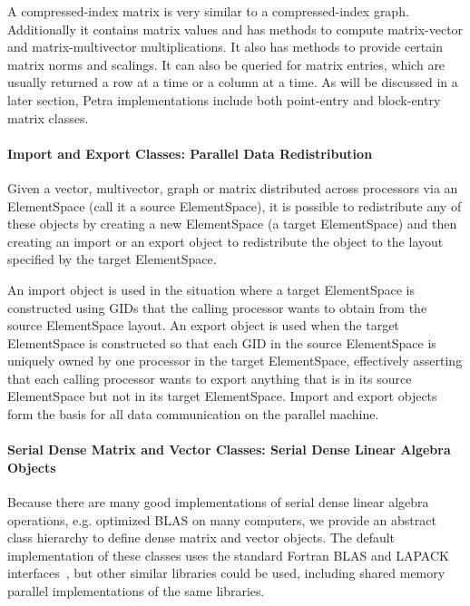 \documentclass[12pt,relax]{PetraObjectModel}
\begin{document}
A compressed-index matrix is very similar to a compressed-index graph. 
Additionally it 
contains matrix values and has methods to compute matrix-vector and
matrix-multivector multiplications.  It also has methods to provide certain
matrix norms and scalings.  It can also be queried for matrix entries, which
are usually returned a row at a time or a column at a time.
As will be discussed in a later section, Petra implementations include both
point-entry and block-entry matrix classes.


\paragraph{Import and Export Classes:  Parallel Data Redistribution}

Given a vector, multivector, graph or matrix distributed across processors
via an ElementSpace (call it a source ElementSpace), it is possible to
redistribute any of these
objects by creating a new ElementSpace (a target ElementSpace) and then
creating an import or
an export object to redistribute the object to the layout specified by the
target ElementSpace.

An import object is used in the situation where a target ElementSpace is
 constructed
using GIDs that the calling processor wants to obtain from the source
 ElementSpace
layout.  An export object is used when the target ElementSpace is constructed
so that each GID in the source ElementSpace is uniquely owned by one processor
 in the target ElementSpace, effectively asserting that each calling processor
 wants to export anything
that is in its source ElementSpace but not in its target ElementSpace.
  Import and export
objects form the basis for all data communication on the parallel machine.

\paragraph{Serial Dense Matrix and Vector Classes:  Serial Dense Linear Algebra Objects}

Because there are many good implementations of serial dense linear algebra
operations, e.g. optimized BLAS on many computers, we provide an abstract
class hierarchy to define dense matrix and vector objects.  The default
implementation of these classes uses the standard Fortran BLAS and LAPACK
interfaces~\cite{BLAS1,BLAS2,BLAS3,LAPACK}, but other similar libraries could
be used, including shared memory parallel implementations of the same
libraries.
\end{document}
